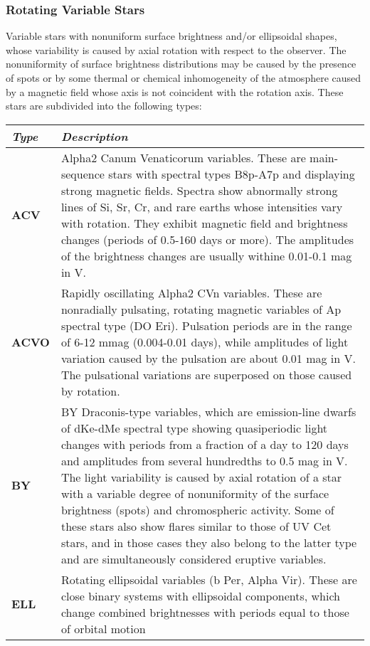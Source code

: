 \subsubsection{Rotating Variable Stars}\label{rotating-variable-stars}

Variable stars with nonuniform surface brightness and/or ellipsoidal
shapes, whose variability is caused by axial rotation with respect to
the observer. The nonuniformity of surface brightness distributions may
be caused by the presence of spots or by some thermal or chemical
inhomogeneity of the atmosphere caused by a magnetic field whose axis is
not coincident with the rotation axis. These stars are subdivided into
the following types:

\begin{longtabu} to \textwidth {l|X}
\toprule
\emph{Type} & \emph{Description}\\
\midrule
\textbf{ACV} & Alpha2 Canum Venaticorum variables. These are
main-sequence stars with spectral types B8p-A7p and displaying strong
magnetic fields. Spectra show abnormally strong lines of Si, Sr, Cr, and
rare earths whose intensities vary with rotation. They exhibit magnetic
field and brightness changes (periods of 0.5-160 days or more). The
amplitudes of the brightness changes are usually withine 0.01-0.1 mag in
V.\\
\midrule
\textbf{ACVO} & Rapidly oscillating Alpha2 CVn variables. These are
nonradially pulsating, rotating magnetic variables of Ap spectral type
(DO Eri). Pulsation periods are in the range of 6-12 mmag (0.004-0.01
days), while amplitudes of light variation caused by the pulsation are
about 0.01 mag in V. The pulsational variations are superposed on those
caused by rotation.\\
\midrule
\textbf{BY} & BY Draconis-type variables, which are emission-line dwarfs
of dKe-dMe spectral type showing quasiperiodic light changes with
periods from a fraction of a day to 120 days and amplitudes from several
hundredths to 0.5 mag in V. The light variability is caused by axial
rotation of a star with a variable degree of nonuniformity of the
surface brightness (spots) and chromospheric activity. Some of these
stars also show flares similar to those of UV Cet stars, and in those
cases they also belong to the latter type and are simultaneously
considered eruptive variables.\\
\midrule
\textbf{ELL} & Rotating ellipsoidal variables (b Per, Alpha Vir). These
are close binary systems with ellipsoidal components, which change
combined brightnesses with periods equal to those of orbital motion

\end{longtabu}

